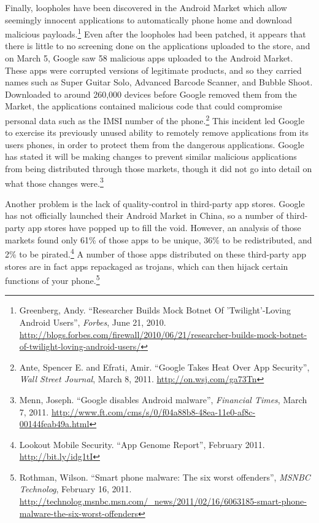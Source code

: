 \documentclass[11pt]{article}
\begin{document}
Finally, loopholes have been discovered in the Android Market which allow seemingly innocent applications to automatically phone home and download malicious payloads.\footnote{Greenberg, Andy. ``Researcher Builds Mock Botnet Of 'Twilight'-Loving Android Users'', \textit{Forbes}, June 21, 2010. \url{http://blogs.forbes.com/firewall/2010/06/21/researcher-builds-mock-botnet-of-twilight-loving-android-users/}} Even after the loopholes had been patched, it appears that there is little to no screening done on the applications uploaded to the store, and on March 5, Google saw 58 malicious apps uploaded to the Android Market. These apps were corrupted versions of legitimate products, and so they carried names such as Super Guitar Solo, Advanced Barcode Scanner, and Bubble Shoot. Downloaded to around 260,000 devices before Google removed them from the Market, the applications contained malicious code that could compromise personal data such as  the IMSI number of the phone.\footnote{Ante, Spencer E. and Efrati, Amir. ``Google Takes Heat Over App Security'', \textit{Wall Street Journal}, March 8, 2011. \url{http://on.wsj.com/ga73Tn}} This incident led Google to exercise its previously unused ability to remotely remove applications from its users phones, in order to protect them from the dangerous applications. Google has stated it will be making changes to prevent similar malicious applications from being distributed through those markets, though it did not go into detail on what those changes were.\footnote{Menn, Joseph. ``Google disables Android malware'', \textit{Financial Times}, March 7, 2011. \url{http://www.ft.com/cms/s/0/f04a88b8-48ea-11e0-af8c-00144feab49a.html}}

Another problem is the lack of quality-control in third-party app stores. Google has not officially launched their Android Market in China, so a number of third-party app stores have popped up to fill the void. However, an analysis of those markets found only 61\% of those apps to be unique, 36\% to be redistributed, and 2\% to be pirated.\footnote{Lookout Mobile Security. ``App Genome Report'', February 2011. \url{http://bit.ly/idg1tI}} A number of those apps distributed on these third-party app stores are in fact apps repackaged as trojans, which can then hijack certain functions of your phone.\footnote{Rothman, Wilson. ``Smart phone malware: The six worst offenders'', \textit{MSNBC Technolog}, February 16, 2011. \url{http://technolog.msnbc.msn.com/_news/2011/02/16/6063185-smart-phone-malware-the-six-worst-offenders}}
\end{document}
